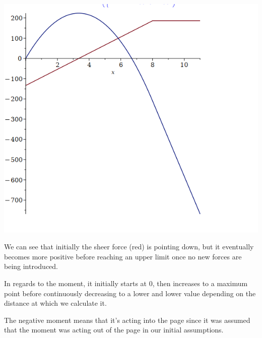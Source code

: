 \documentclass{article}[14pt, letterpaper, Times New Roman]
\begin{document}
\includegraphics[width=15cm]{l13-pbq-o.png}

We can see that initially the sheer force (red) is pointing down, but it eventually becomes more positive before reaching an upper limit once no new forces are being introduced.

In regards to the moment, it initially starts at 0, then increases to a maximum point before continuously decreasing to a lower and lower value depending on the distance at which we calculate it.

The negative moment means that it's acting into the page since it was assumed that the moment was acting out of the page in our initial assumptions.
\end{document}
